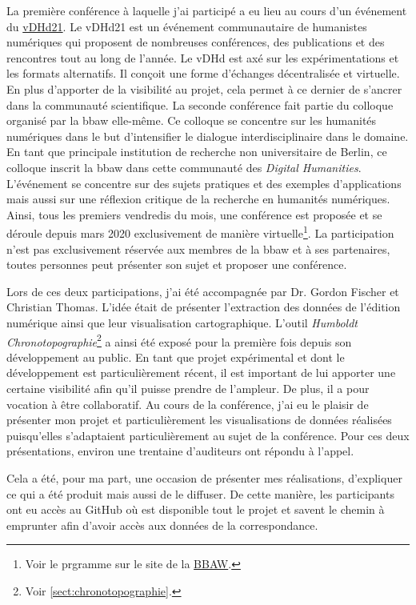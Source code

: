 \documentclass[a4paper, 12pt, twoside]{book}
\begin{document}
La première conférence à laquelle j'ai participé a eu lieu au cours d'un événement du \href{https://vdhd2021.hypotheses.org/}{vDHd21}. Le vDHd21 est un événement communautaire de humanistes numériques qui proposent de nombreuses conférences, des publications et des rencontres tout au long de l'année.  Le vDHd est axé sur les expérimentations et les formats alternatifs. Il conçoit une forme d'échanges décentralisée et virtuelle. En plus d'apporter de la visibilité au projet, cela permet à ce dernier de s'ancrer dans la communauté scientifique. 
La seconde conférence fait partie du colloque organisé par la \gls{bbaw} elle-même. Ce colloque se concentre sur les humanités numériques dans le but d'intensifier le dialogue interdisciplinaire dans le domaine. En tant que principale institution de recherche non universitaire de Berlin, ce colloque inscrit la \gls{bbaw} dans cette communauté des \textit{Digital Humanities}. L'événement se concentre sur des sujets pratiques et des exemples d'applications mais aussi sur une réflexion critique de la recherche en humanités numériques. Ainsi, tous les premiers vendredis du mois, une conférence est proposée et se déroule depuis mars 2020 exclusivement de manière virtuelle\footnote{Voir le prgramme sur le site de la \href{https://www.bbaw.de/bbaw-digital/dh-kolloquium}{BBAW}.}. La participation n'est pas exclusivement réservée aux membres de la \gls{bbaw} et à ses partenaires, toutes personnes peut présenter son sujet et proposer une conférence.

Lors de ces deux participations, j'ai été accompagnée par Dr. Gordon Fischer et Christian Thomas. L'idée était de présenter l'extraction des données de l'édition numérique ainsi que leur visualisation cartographique. L'outil \textit{Humboldt Chronotopographie}\footnote{Voir \autoref{sect:chronotopographie}.} a ainsi été exposé pour la première fois depuis son développement au public. En tant que projet expérimental et dont le développement est particulièrement récent, il est important de lui apporter une certaine visibilité afin qu'il puisse prendre de l'ampleur. De plus, il a pour vocation à être collaboratif. Au cours de la conférence, j'ai eu le plaisir de présenter mon projet et particulièrement les visualisations de données réalisées puisqu'elles s'adaptaient particulièrement au sujet de la conférence. Pour ces deux présentations, environ une trentaine d'auditeurs ont répondu à l'appel. 

Cela a été, pour ma part, une occasion de présenter mes réalisations, d'expliquer ce qui a été produit mais aussi de le diffuser. De cette manière, les participants ont eu accès au GitHub où est disponible tout le projet et savent le chemin à emprunter afin d'avoir accès aux données de la correspondance.
\end{document}
